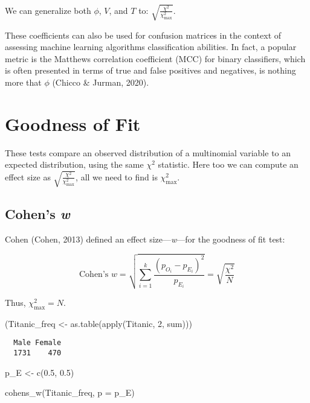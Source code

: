 \documentclass[
]{article}
\newenvironment{Shaded}{\begin{snugshade}}{\end{snugshade}}
\newcommand{\AttributeTok}[1]{\textcolor[rgb]{0.77,0.63,0.00}{#1}}
\newcommand{\DecValTok}[1]{\textcolor[rgb]{0.00,0.00,0.81}{#1}}
\newcommand{\FloatTok}[1]{\textcolor[rgb]{0.00,0.00,0.81}{#1}}
\newcommand{\FunctionTok}[1]{\textcolor[rgb]{0.00,0.00,0.00}{#1}}
\newcommand{\NormalTok}[1]{#1}
\newcommand{\OtherTok}[1]{\textcolor[rgb]{0.56,0.35,0.01}{#1}}
\begin{document}
We can generalize both \(\phi\), \(V\), and \(T\) to:
\(\sqrt{\frac{\chi^2}{\chi^2_{\text{max}}}}\).

These coefficients can also be used for confusion matrices in the
context of assessing machine learning algorithms classification
abilities. In fact, a popular metric is the Matthews correlation
coefficient (MCC) for binary classifiers, which is often presented in
terms of true and false positives and negatives, is nothing more that
\(\phi\) (Chicco \& Jurman, 2020).

\hypertarget{goodness-of-fit}{%
\section{Goodness of Fit}\label{goodness-of-fit}}

These tests compare an observed distribution of a multinomial variable
to an expected distribution, using the same \(\chi^2\) statistic. Here
too we can compute an effect size as
\(\sqrt{\frac{\chi^2}{\chi^2_{\text{max}}}}\), all we need to find is
\(\chi^2_{\text{max}}\).

\hypertarget{cohens-w}{%
\subsection{\texorpdfstring{Cohen's
\emph{w}}{Cohen's w}}\label{cohens-w}}

Cohen (Cohen, 2013) defined an effect size---\emph{w}---for the goodness
of fit test:

\[
\text{Cohen's } w = \sqrt{\sum_{i=1}^{k}{\frac{(p_{O_i}-p_{E_i})^2}{p_{E_i}}}} = \sqrt{\frac{\chi^2}{N}}
\]

Thus, \(\chi^2_\text{max} = N\).

\begin{Shaded}
\begin{Highlighting}[]
\NormalTok{(Titanic\_freq }\OtherTok{\textless{}{-}} \FunctionTok{as.table}\NormalTok{(}\FunctionTok{apply}\NormalTok{(Titanic, }\DecValTok{2}\NormalTok{, sum)))}
\end{Highlighting}
\end{Shaded}

\begin{verbatim}
  Male Female 
  1731    470 
\end{verbatim}

\begin{Shaded}
\begin{Highlighting}[]
\NormalTok{p\_E }\OtherTok{\textless{}{-}} \FunctionTok{c}\NormalTok{(}\FloatTok{0.5}\NormalTok{, }\FloatTok{0.5}\NormalTok{)}

\FunctionTok{cohens\_w}\NormalTok{(Titanic\_freq, }\AttributeTok{p =}\NormalTok{ p\_E)}
\end{Highlighting}
\end{Shaded}
\end{document}
